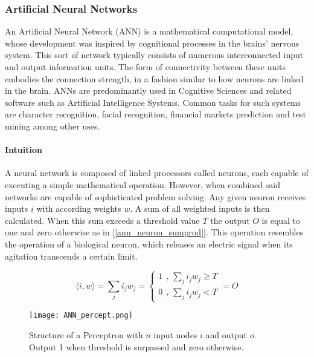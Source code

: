 \subsubsection{Artificial Neural Networks}
	An Artificial Neural Network (ANN) \cite{mcculloch1943logical} is a mathematical computational model, whose development was inspired by cognitional processes in the brains' nervous system. This sort of network typically consists of numerous interconnected input and output information units. The form of connectivity between these units embodies the connection strength, in a fashion similar to how neurons are linked in the brain. ANNs are predominantly used in Cognitive Sciences and related software such as Artificial Intelligence Systems. Common tasks for such systems are character recognition, facial recognition, financial markets prediction and test mining among other uses.
	
	\paragraph{Intuition}
		A neural network is composed of linked processors called neurons, each capable of executing a simple mathematical operation. However, when combined said networks are capable of sophisticated problem solving. Any given neuron receives inputs $ i $ with according weights $ w $. A sum of all weighted inputs is then calculated. When this sum exceeds a threshold value $ T $ the output $ O $ is equal to one and zero otherwise as in [\ref{ann_neuron_sumprod}]. This operation resembles the operation of a biological neuron, which releases an electric signal when its agitation transcends a certain limit.
	
	\begin{equation}
		\langle i,w \rangle = \sum_j i_j w_j = 
			\begin{cases}
				1 \ \ \text{,  } \sum_j i_j w_j \geq T \\
				0 \ \ \text{,  } \sum_j i_j w_j < T 
			\end{cases}
		 = O
		\label{ann_neuron_sumprod}
	\end{equation}
	
	\begin{figure}[h]
		\centering
		\captionsetup{width=0.8\textwidth}
		\texttt{[image: ANN\_percept.png]}
		\caption[ANN Perceptron]{
			\footnotesize{
				Structure of a Perceptron with $ n $ input nodes $ i $ and output $ o $. Output 1 when threshold is surpassed and zero otherwise.
			}
		} 
		\label{ANN_percept}
	\end{figure}
	
